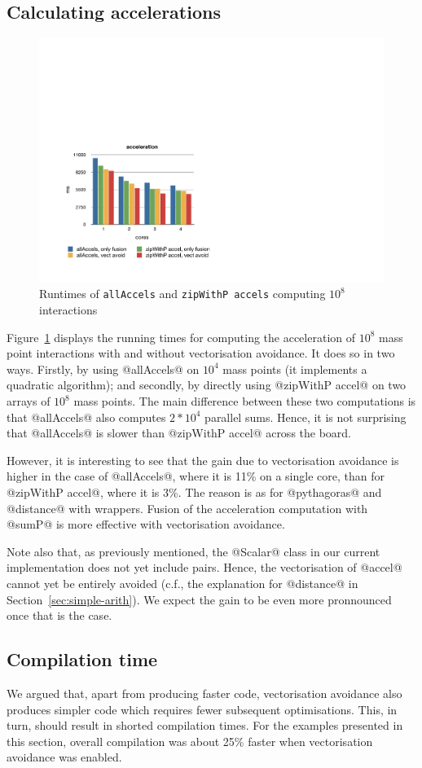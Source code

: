 \subsection{Calculating accelerations}

\begin{figure}
\includegraphics[scale=0.6, trim=1.5cm 2cm 0cm 9cm, clip]{data/Accel.pdf}
\caption{Runtimes of \texttt{allAccels} and \texttt{zipWithP accels} computing $10^8$ interactions}
\label{Figure:Accel}
\end{figure}
%
Figure~\ref{Figure:Accel} displays the running times for computing the acceleration of $10^8$ mass point interactions with and without vectorisation avoidance. It does so in two ways. Firstly, by using @allAccels@ on $10^4$ mass points (it implements a quadratic algorithm); and secondly, by directly using @zipWithP accel@ on two arrays of $10^8$ mass points. The main difference between these two computations is that @allAccels@ also computes $2*10^4$ parallel sums. Hence, it is not surprising that @allAccels@ is slower than @zipWithP accel@ across the board.

However, it is interesting to see that the gain due to vectorisation avoidance is higher in the case of @allAccels@, where it is 11\% on a single core, than for @zipWithP accel@, where it is 3\%. The reason is as for @pythagoras@ and @distance@ with wrappers. Fusion of the acceleration computation with @sumP@ is more effective with vectorisation avoidance.

Note also that, as previously mentioned, the @Scalar@ class in our current implementation does not yet include pairs. Hence, the vectorisation of @accel@ cannot yet be entirely avoided (c.f., the explanation for @distance@ in Section~\ref{sec:simple-arith}). We expect the gain to be even more pronnounced once that is the case.

\subsection{Compilation time}

We argued that, apart from producing faster code, vectorisation avoidance also produces simpler code which requires fewer subsequent optimisations.  This, in turn, should result in shorted compilation times.  For the examples presented in this section, overall compilation was about 25\% faster when vectorisation avoidance was enabled.
